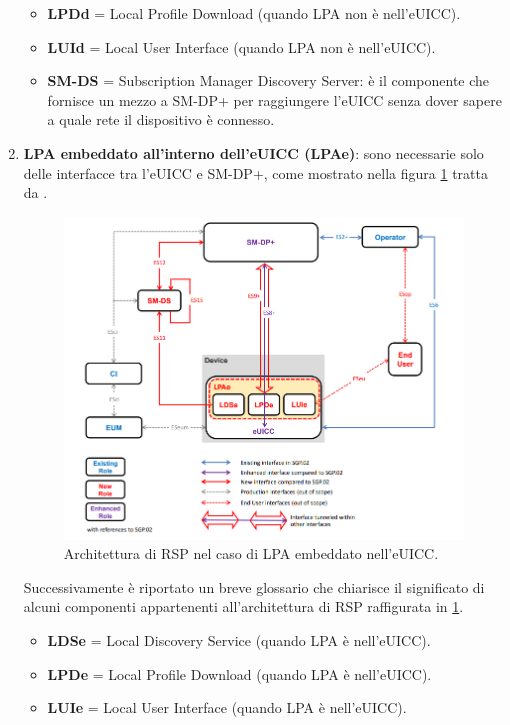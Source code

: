 \documentclass[10pt, twoside, openany]{book}
\begin{document}
\begin{enumerate}
\begin{itemize}
\item \textbf{LPDd} = Local Profile Download (quando LPA non è nell'eUICC).
\item \textbf{LUId} = Local User Interface (quando LPA non è nell'eUICC).
\item \textbf{SM-DS} = Subscription Manager Discovery Server: è il componente che fornisce un mezzo a SM-DP+ per raggiungere l'eUICC senza dover sapere a quale rete il dispositivo è connesso.
\end{itemize}
\item \textbf{LPA embeddato all'interno dell'eUICC (LPAe)}: sono necessarie solo delle interfacce tra l'eUICC e SM-DP+, come mostrato nella figura \ref{fig:RSP-LPAe} tratta da \cite{GSMA-docs}.
\begin{figure}
\includegraphics[width=\linewidth]{RSP-LPAe.png}
\caption{Architettura di RSP nel caso di LPA embeddato nell'eUICC.}
\label{fig:RSP-LPAe}
\end{figure}
Successivamente è riportato un breve glossario che chiarisce il significato di alcuni componenti appartenenti all'architettura di RSP raffigurata in \ref{fig:RSP-LPAe}.
\begin{itemize}
\item \textbf{LDSe} = Local Discovery Service (quando LPA è nell'eUICC).
\item \textbf{LPDe} = Local Profile Download (quando LPA è nell'eUICC).
\item \textbf{LUIe} = Local User Interface (quando LPA è nell'eUICC).
\end{itemize}
\end{enumerate}
\end{document}
